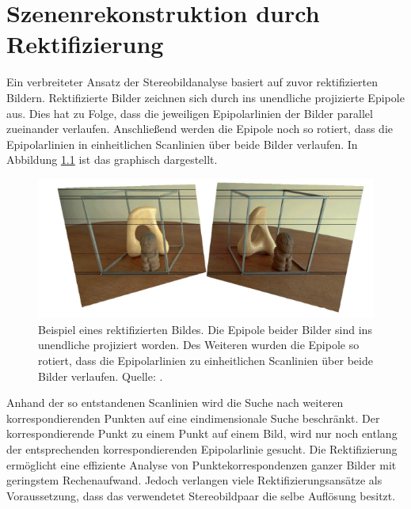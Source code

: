 \chapter{Szenenrekonstruktion durch Rektifizierung}
\label{sec:rectification}


Ein verbreiteter Ansatz der Stereobildanalyse basiert auf zuvor rektifizierten Bildern.
Rektifizierte Bilder zeichnen sich durch ins unendliche projizierte Epipole aus. Dies hat zu Folge, dass die jeweiligen Epipolarlinien der Bilder parallel zueinander verlaufen. Anschließend werden die Epipole noch so rotiert, dass die Epipolarlinien in einheitlichen Scanlinien über beide Bilder verlaufen\cite{Fusiello,Javier,ZZ,MatlabRec,phdextrinsicPara}. In Abbildung \ref{fig:Scanlinien} ist das graphisch dargestellt.

\begin{figure}[!htb]
	\centering
	\includegraphics[width=.8\linewidth]{images/rectifiziertesBildAusZZ.png}
	\caption[Beispiel eines rektifizierten Bildes mit Scanlinien]{Beispiel eines rektifizierten Bildes. Die Epipole beider Bilder sind ins unendliche projiziert worden. Des Weiteren wurden die Epipole so rotiert, dass die Epipolarlinien zu einheitlichen Scanlinien über beide Bilder verlaufen. Quelle: \cite{ZZ}.} 
	\label{fig:Scanlinien}
\end{figure}

 
Anhand der so entstandenen Scanlinien wird die Suche nach weiteren korrespondierenden Punkten auf eine eindimensionale Suche beschränkt. Der korrespondierende Punkt zu einem Punkt auf einem Bild, wird nur noch entlang der entsprechenden korrespondierenden Epipolarlinie gesucht. Die Rektifizierung ermöglicht eine effiziente Analyse von Punktekorrespondenzen ganzer Bilder mit geringstem Rechenaufwand\cite{ZZ,Fusiello,Javier}. Jedoch verlangen viele Rektifizierungsansätze als Voraussetzung, dass das verwendetet Stereobildpaar die selbe Auflösung besitzt.\\

